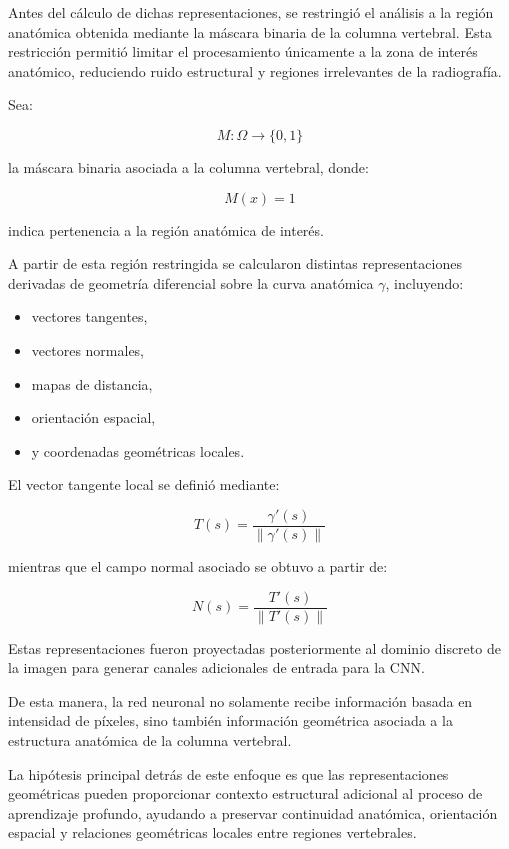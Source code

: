 \documentclass[conference]{IEEEtran}
\begin{document}
Antes del cálculo de dichas representaciones, se restringió el análisis a la región anatómica obtenida mediante la máscara binaria de la columna vertebral. Esta restricción permitió limitar el procesamiento únicamente a la zona de interés anatómico, reduciendo ruido estructural y regiones irrelevantes de la radiografía.

Sea:

\[
M:\Omega \rightarrow \{0,1\}
\]

la máscara binaria asociada a la columna vertebral, donde:

\[
M(x)=1
\]

indica pertenencia a la región anatómica de interés.

A partir de esta región restringida se calcularon distintas representaciones derivadas de geometría diferencial sobre la curva anatómica $\gamma$, incluyendo:

\begin{itemize}
    \item vectores tangentes,
    \item vectores normales,
    \item mapas de distancia,
    \item orientación espacial,
    \item y coordenadas geométricas locales.
\end{itemize}

El vector tangente local se definió mediante:

\[
T(s)=\frac{\gamma'(s)}{\|\gamma'(s)\|}
\]

mientras que el campo normal asociado se obtuvo a partir de:

\[
N(s)=\frac{T'(s)}{\|T'(s)\|}
\]

Estas representaciones fueron proyectadas posteriormente al dominio discreto de la imagen para generar canales adicionales de entrada para la CNN.


De esta manera, la red neuronal no solamente recibe información basada en intensidad de píxeles, sino también información geométrica asociada a la estructura anatómica de la columna vertebral.

La hipótesis principal detrás de este enfoque es que las representaciones geométricas pueden proporcionar contexto estructural adicional al proceso de aprendizaje profundo, ayudando a preservar continuidad anatómica, orientación espacial y relaciones geométricas locales entre regiones vertebrales.
\end{document}
